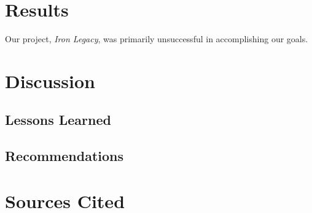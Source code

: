 \documentclass{article}
\begin{document}
\section*{Results}

Our project, \emph{Iron Legacy}, was primarily unsuccessful in
    accomplishing our goals.

\section*{Discussion}

\subsection*{Lessons Learned}

\subsection*{Recommendations}

\section*{Sources Cited}
\end{document}
